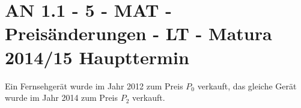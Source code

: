 \section{AN 1.1 - 5 - MAT - Preisänderungen - LT - Matura 2014/15 Haupttermin}

\begin{beispiel}[AN 1.1]{1} %
Ein Fernsehgerät wurde im Jahr 2012 zum Preis $P_0$ verkauft, das gleiche Gerät wurde im Jahr
2014 zum Preis $P_2$ verkauft.

\end{beispiel}